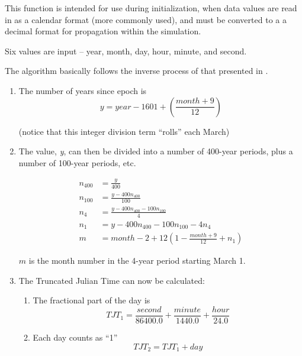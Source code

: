 {\begin{enumerate}
{\begin{enumerate}
\label{ref:convertfromcalendar}This function is intended for use during
initialization, when data values are read in as a calendar format (more
commonly used), and must be converted to a a decimal format for
propagation within the simulation.




Six values are input -- year, month, day, hour, minute, and second.

The algorithm basically follows the inverse process of that presented in
.


\begin{enumerate}
\item The number of years since epoch is
\begin{equation*}
y={year}-1601+\left(\frac{{month}+9}{12}\right)
\end{equation*}

(notice that this integer division term
{\textquotedblleft}rolls{\textquotedblright} each March)
\item The value, \textit{y}, can then be divided into a number of
400-year periods, plus a number of 100-year periods, etc.

\begin{align*}
n_{400} &=\frac{y}{400} \\
n_{100} &=\frac{y-400n_{400}}{100} \\
n_{4} &=\frac{y-400n_{400}-100n_{100}}{4} \\
n_{1} &=y-400n_{400}-100n_{100}-4n_{4}  \\
m &={month}-2+12\left(1-\frac{{month}+9}{12}+n_{1}\right)
\end{align*}

$m$ is the month number in the 4-year period starting March 1.


\item The Truncated Julian Time can now be calculated:

\begin{enumerate}
\item The fractional part of the day is\ \
\begin{equation*}
{TJT}_{1}=\frac{{second}}{86400.0}+\frac{{minute}}{1440.0}+\frac{{hour}}{24.0}
\end{equation*}

\item Each day counts as {\textquotedblleft}1{\textquotedblright}
\begin{equation*}
{TJT}_{2}={TJT}_{1}+{day}
\end{equation*}


\end{enumerate}
\end{enumerate}
\end{enumerate}}
\end{enumerate}}
